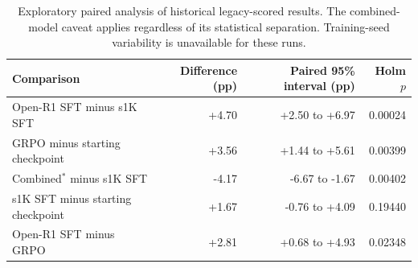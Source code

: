 \begin{table}[ht]
\centering
\small
\begin{tabular}{@{}lrrr@{}}
\toprule
Comparison & Difference (pp) & Paired 95\% interval (pp) & Holm $p$ \\
\midrule
Open-R1 SFT minus s1K SFT & +4.70 & +2.50 to +6.97 & 0.00024 \\
GRPO minus starting checkpoint & +3.56 & +1.44 to +5.61 & 0.00399 \\
Combined$^*$ minus s1K SFT & -4.17 & -6.67 to -1.67 & 0.00402 \\
s1K SFT minus starting checkpoint & +1.67 & -0.76 to +4.09 & 0.19440 \\
Open-R1 SFT minus GRPO & +2.81 & +0.68 to +4.93 & 0.02348 \\
\bottomrule
\end{tabular}
\caption{Exploratory paired analysis of historical legacy-scored results. The combined-model caveat applies regardless of its statistical separation. Training-seed variability is unavailable for these runs.}
\end{table}
